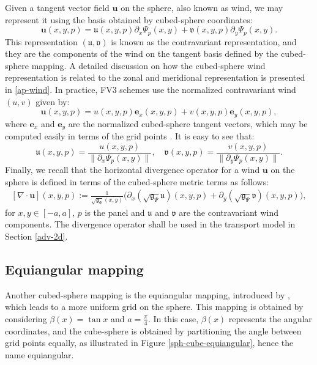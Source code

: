 \documentclass[preprint,12pt]{elsarticle}
\begin{document}
\begin{linenumbers}
Given a tangent vector field $\boldsymbol{u}$ on the sphere, also known as wind, we may represent it using the basis obtained by cubed-sphere coordinates:
\begin{equation}
	\label{contravariant-wind}
	\boldsymbol{u}(x, y, p) = 
	\mathfrak{u}(x, y,p ) \partial_x{\Psi}_p(x, y) + 
	\mathfrak{v}(x, y, p) \partial_y{\Psi}_p(x, y).
\end{equation}
This representation $(\mathfrak{u},\mathfrak{v})$ is known as the contravariant representation, and they are the components of the wind on the tangent basis defined by the cubed-sphere mapping.
A detailed discussion on how the cubed-sphere wind representation is related to the zonal and meridional representation is presented in \ref{ap-wind}.
In practice, FV3 schemes \cite{putman:2007, harris:2021} use the normalized contravariant wind
$({u},{v})$ given by:
\begin{equation}
	\label{norm-contravariant-wind}
	\boldsymbol{u}(x, y, p) = 
	{u}(x, y, p) \boldsymbol{e}_x(x, y, p) + 
	{v}(x, y, p) \boldsymbol{e}_y(x, y, p),
\end{equation}
where $\boldsymbol{e}_x$ and $\boldsymbol{e}_y$ are the normalized cubed-sphere tangent vectors, which may be computed easily in terms of the grid points \cite[Appendix C2]{chen:2021}.
It is easy to see that:
\begin{equation}
	\label{contra-uv}
	\mathfrak{u}(x,y,p)  = \frac{{u}(x,y,p)}{\|\partial_x{\Psi}_p(x,y)\|}, \quad
	\mathfrak{v}(x,y,p)  = \frac{{v}(x,y,p)}{\|\partial_y{\Psi}_p(x,y)\|}.
\end{equation}
Finally, we recall that the horizontal divergence operator for a  wind $\boldsymbol{u}$  on the sphere is defined in terms of the cubed-sphere metric terms as follows:
\begin{align}
	\label{div-def}
	[\nabla \cdot {\boldsymbol{u}}](x,y,p) :=
	\frac{1}{\sqrt{\mathfrak{g}_{\Psi}}(x,y)}
	\bigg(
	\partial_x(\sqrt{\mathfrak{g}_{\Psi}}\mathfrak{u})(x,y,p) +
	\partial_y(\sqrt{\mathfrak{g}_{\Psi}}\mathfrak{v})(x,y,p)
	\bigg),
\end{align}
for $x,y\in[-a,a]$, $p$ is the panel and
$\mathfrak{u}$ and $\mathfrak{v}$ are the contravariant wind components.
The divergence operator shall be used in the transport model in Section \ref{adv-2d}.

\subsection{Equiangular mapping}
\label{cs-equiangular}
Another cubed-sphere mapping is the equiangular mapping, 
introduced by \cite{ronchi:1996}, which leads to a more uniform grid on the sphere.
This mapping is obtained by considering $\beta(x) = \tan{x}$ and $a=\frac{\pi}{4}$.
In this case, $\beta(x)$ represents the angular coordinates, and the cube-sphere is obtained by partitioning the angle between
grid points equally, as illustrated in Figure \ref{sph-cube-equiangular}, hence the name equiangular.


\end{linenumbers}
\end{document}

